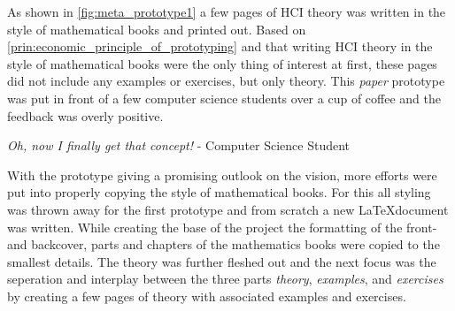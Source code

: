 

As shown in \ref{fig:meta_prototype1} a few pages of HCI theory was written in the style of mathematical books and printed out. Based on \ref{prin:economic_principle_of_prototyping} and that writing HCI theory in the style of mathematical books were the only thing of interest at first, these pages did not include any examples or exercises, but only theory. This \emph{paper} prototype was put in front of a few computer science students over a cup of coffee and the feedback was overly positive.

\begin{displayquote}
  \emph{Oh, now I finally get that concept!} - Computer Science Student
\end{displayquote}

With the prototype giving a promising outlook on the vision, more efforts were put into properly copying the style of mathematical books. For this all styling was thrown away for the first prototype and from scratch a new \LaTeX document was written. While creating the base of the project the formatting of the front- and backcover, parts and chapters of the mathematics books were copied to the smallest details. The theory was further fleshed out and the next focus was the seperation and interplay between the three parts \emph{theory}, \emph{examples}, and \emph{exercises} by creating a few pages of theory with associated examples and exercises.








